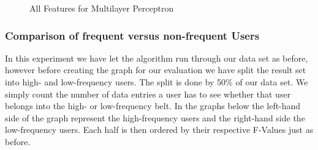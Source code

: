 \begin{figure}[H]
	\caption{All Features for Multilayer Perceptron}
\end{figure}


\newpage
\subsubsection{Comparison of frequent versus non-frequent Users}
In this experiment we have let the algorithm run through our data set as before, however before creating the graph for our evaluation we have split the result set into high- and low-frequency users. The split is done by 50\% of our data set. We simply count the number of data entries a user has to see whether that user belongs into the high- or low-frequency belt. In the graphs below the left-hand side of the graph represent the high-frequency users and the right-hand side the low-frequency users. Each half is then ordered by their respective F-Values just as before.

